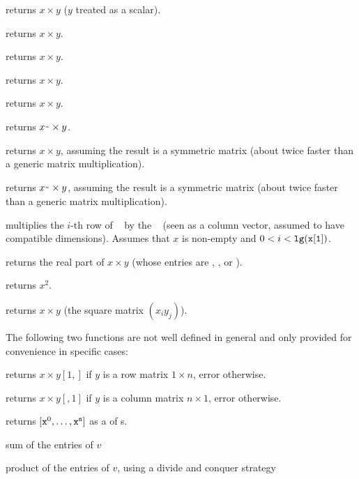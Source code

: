 
 returns $x\times y$ ($y$ treated as a
scalar).

 returns $x\times y$.

 returns $x\times y$.

 returns $x\times y$.

 returns $x\times y$.

 returns $x\til \times y$.

 returns $x\times y$, assuming
the result is a symmetric matrix (about twice faster than a generic matrix
multiplication).

 returns $x\til \times y$, assuming
the result is a symmetric matrix (about twice faster than a generic matrix
multiplication).

 multiplies the $i$-th row of
~ by the ~ (seen as a column vector, assumed
to have compatible dimensions). Assumes that $x$ is non-empty and $0 < i <
{\tt lg(x[1])}$.

 returns the real part of $x\times y$
(whose entries are , ,  or ).

 returns $x^2$.

 returns $x\times y$ (the square matrix
$(x_iy_j)$).

The following two functions are not well defined in general and only provided
for convenience in specific cases:

 returns $x\times y[1,]$ if $y$ is
a row matrix $1\times n$, error otherwise.

 returns $x\times y[,1]$ if $y$ is
a column matrix $n\times 1$, error otherwise.

 returns $[{\tt x}^0,
\dots, {\tt x}^{\tt n}]$ as a  of s.

\smallskip

 sum of the entries of $v$

 product of the entries of $v$, using
a divide and conquer strategy

